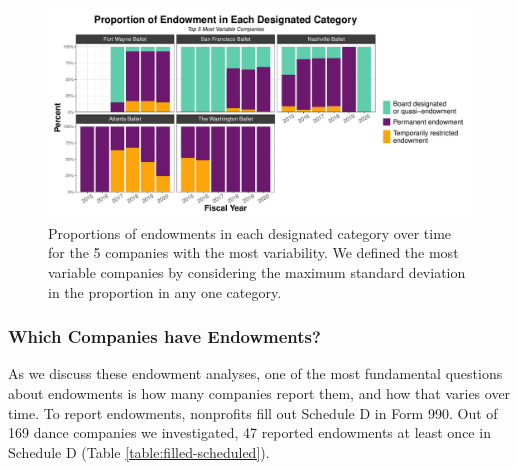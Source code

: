 \documentclass[Dance Data
Project,article,submit,moreauthors,pdftex]{mdpi}
\begin{document}
\begin{figure}[H]
\includegraphics[width=1\linewidth,]{../images/prop_endowment_type_most_variable} \caption{\label{fig:prop-most-variable} Proportions of endowments in each designated category over time for the 5 companies with the most variability. We defined the most variable companies by considering the maximum standard deviation in the proportion in any one category.}\label{fig:proportion-endowment-categories-most-variable}
\end{figure}

\hypertarget{which-companies-have-endowments}{%
\subsubsection{Which Companies have
Endowments?}\label{which-companies-have-endowments}}

As we discuss these endowment analyses, one of the most fundamental
questions about endowments is how many companies report them, and how
that varies over time. To report endowments, nonprofits fill out
Schedule D in Form 990. Out of 169 dance companies we investigated, 47
reported endowments at least once in Schedule D (Table
\ref{table:filled-scheduled}).
\end{document}
